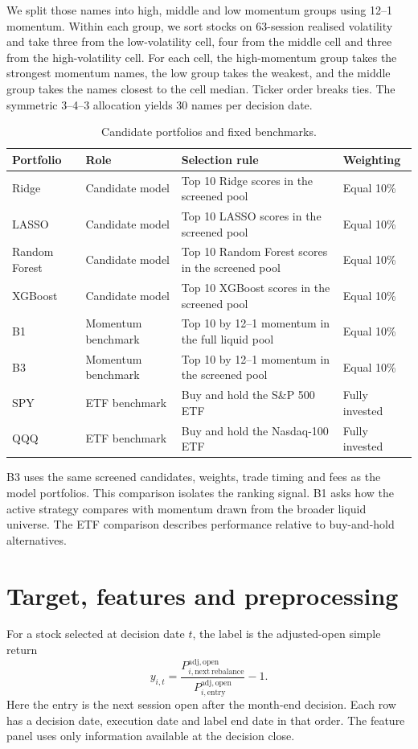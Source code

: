 \documentclass[11pt,a4paper]{article}
\begin{document}
We split those names into high, middle and low momentum groups using 12--1 momentum. Within each group, we sort stocks on 63-session realised volatility and take three from the low-volatility cell, four from the middle cell and three from the high-volatility cell. For each cell, the high-momentum group takes the strongest momentum names, the low group takes the weakest, and the middle group takes the names closest to the cell median. Ticker order breaks ties. The symmetric 3--4--3 allocation yields 30 names per decision date.

\begin{table}[H]
\centering
\small
\setlength{\tabcolsep}{4pt}
\begin{tabular}{@{}llp{7cm}l@{}}
\toprule
Portfolio & Role & Selection rule & Weighting \\
\midrule
Ridge & Candidate model & Top 10 Ridge scores in the screened pool & Equal 10\% \\
LASSO & Candidate model & Top 10 LASSO scores in the screened pool & Equal 10\% \\
Random Forest & Candidate model & Top 10 Random Forest scores in the screened pool & Equal 10\% \\
XGBoost & Candidate model & Top 10 XGBoost scores in the screened pool & Equal 10\% \\
\midrule
B1 & Momentum benchmark & Top 10 by 12--1 momentum in the full liquid pool & Equal 10\% \\
B3 & Momentum benchmark & Top 10 by 12--1 momentum in the screened pool & Equal 10\% \\
SPY & ETF benchmark & Buy and hold the S\&P 500 ETF & Fully invested \\
QQQ & ETF benchmark & Buy and hold the Nasdaq-100 ETF & Fully invested \\
\bottomrule
\end{tabular}
\caption{Candidate portfolios and fixed benchmarks.}
\label{tab:strategies}
\end{table}

B3 uses the same screened candidates, weights, trade timing and fees as the model portfolios. This comparison isolates the ranking signal. B1 asks how the active strategy compares with momentum drawn from the broader liquid universe. The ETF comparison describes performance relative to buy-and-hold alternatives.

\clearpage
\section{Target, features and preprocessing}
\label{sec:features}
For a stock selected at decision date \(t\), the label is the adjusted-open simple return
\[
y_{i,t} = \frac{P^{\mathrm{adj,open}}_{i,\mathrm{next\ rebalance}}}
                  {P^{\mathrm{adj,open}}_{i,\mathrm{entry}}}-1.
\]
Here the entry is the next session open after the month-end decision. Each row has a decision date, execution date and label end date in that order. The feature panel uses only information available at the decision close.
\end{document}

